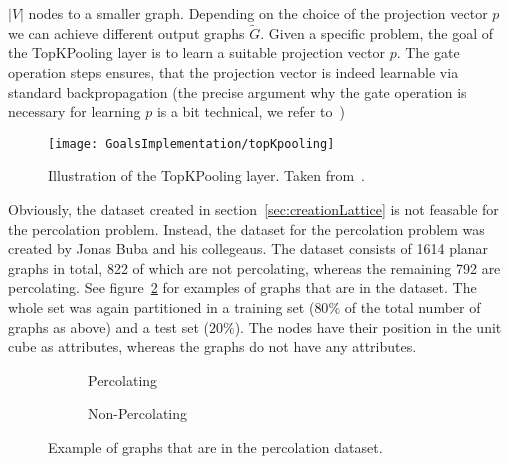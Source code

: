$|V|$ nodes to a smaller graph. Depending on the choice of the projection vector $p$ we can
achieve different output graphs $\tilde{G}$. Given a specific problem, the goal of the 
TopKPooling layer is to learn a suitable projection vector $p$.
The gate operation steps ensures, that the projection vector is indeed learnable via standard backpropagation
(the precise argument why the gate operation is necessary for learning $p$ is a bit technical, we refer to~\cite{topKPooling})
\begin{figure}
    \centering
    \texttt{[image: GoalsImplementation/topKpooling]}
    \caption{Illustration of the TopKPooling layer. Taken from~\cite{topKPooling}.}
    \label{fig:topKPooling}
\end{figure}

Obviously, the dataset created in section~\ref{sec:creationLattice} is not feasable
for the percolation problem. Instead, the dataset for the percolation problem was created by Jonas Buba and his 
collegeaus. The dataset consists of 1614 planar graphs in total, 822 of which are not percolating, whereas
the remaining 792 are percolating. See figure~\ref{fig:expPercNonPerc} for examples of graphs that are in the dataset.
The whole set was again partitioned in a training set ($80\%$ of the total number of graphs as above)
and a test set ($20\%$). The nodes have their position in the unit cube as attributes, whereas the graphs do not have any attributes.
\begin{figure}[h]
    \centering
    \begin{subfigure}[t]{0.45\textwidth}
        \centering
        \caption{Percolating}
    \end{subfigure}
    \hfill
    \begin{subfigure}[t]{0.45\textwidth}
        \centering
        \caption{Non-Percolating}
    \end{subfigure}
    \caption{Example of graphs that are in the percolation dataset.}
    \label{fig:expPercNonPerc}
\end{figure}